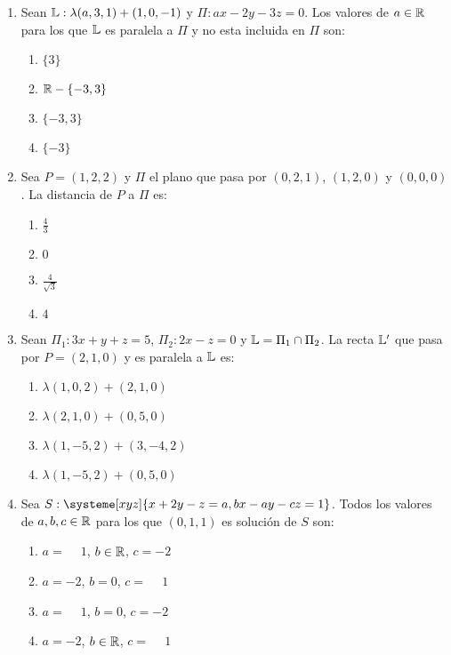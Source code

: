 \documentclass[../practica.root.tex]{subfiles}
\begin{document}
\begin{enumerate}
    \item Sean $\mathbb{L}:\lambda(a,3,1)+(1,0,-1)$ y $\Pi:ax-2y-3z=0$. Los valores de
          $a\in\mathbb{R}$ para los que $\mathbb{L}$ es paralela a $\Pi$ y no esta incluida en
          $\Pi$ son:

          \begin{enumerate}
              \item $\{3\}$
              \item $\mathbb{R}-\{-3,3\}$
              \item $\{-3,3\}$
              \item $\{-3\}$
          \end{enumerate}

          \hrulefill{}
    \item Sea $P=(1,2,2)$ y $\Pi$ el plano que pasa por $(0,2,1)$, $(1,2,0)$ y
          $(0,0,0)$. La distancia de $P$ a $\Pi$ es:

          \begin{enumerate}
              \item $\frac{4}{3}$
              \item $0$
              \item $\frac{4}{\sqrt{3}}$
              \item $4$
          \end{enumerate}

          \hrulefill{}
    \item Sean $\Pi_1:3x+y+z=5$, $\Pi_2:2x-z=0$ y $\mathbb{L}=\Pi_1\cap\Pi_2$. La recta
          $\mathbb{L}'$ que pasa por $P=(2,1,0)$ y es paralela a $\mathbb{L}$ es:

          \begin{enumerate}
              \item $\lambda(1,0,2)+(2,1,0)$
              \item $\lambda(2,1,0)+(0,5,0)$
              \item $\lambda(1,-5,2)+(3,-4,2)$
              \item $\lambda(1,-5,2)+(0,5,0)$
          \end{enumerate}

          \hrulefill{}
    \item Sea $S:\systeme[xyz]{x+2y-z=a,bx-ay-cz=1}$. Todos los valores de
          $a,b,c\in\mathbb{R}$ para los que $(0,1,1)$ es solución de $S$ son:

          \begin{enumerate}
              \item $a=\phantom{-}1$, $b\in\mathbb{R}$, $c=-2$
              \item $a=-2$, $b=0$, $c=\phantom{-}1$
              \item $a=\phantom{-}1$, $b=0$, $c=-2$
              \item $a=-2$, $b\in\mathbb{R}$, $c=\phantom{-}1$
          \end{enumerate}


\end{enumerate}
\end{document}
